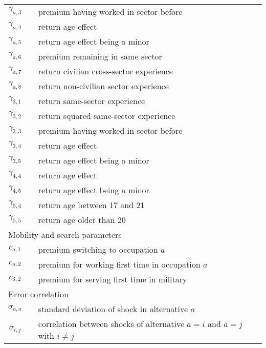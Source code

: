 \begin{ThreePartTable}
\begin{longtable}{@{}cll@{}}
$\gamma_{a,3}$       &  & premium having worked in sector before        							   \\
$\gamma_{a,4}$       &  & return age effect                             											     \\
$\gamma_{a,5}$       &  & return age effect being a minor               										\\
$\gamma_{a,6}$       &  & premium remaining in same sector              								   \\
$\gamma_{a,7}$       &  & return civilian cross-sector experience       								    \\
$\gamma_{a,8}$       &  & return non-civilian sector experience       										 \\
$\gamma_{3,1}$       &  & return same-sector experience                 									  \\
$\gamma_{3,2}$       &  & return squared same-sector experience    										 \\
$\gamma_{3,3}$       &  & premium having worked in sector before   										\\
$\gamma_{3,4}$       &  & return age effect                             												 \\
$\gamma_{3,5}$       &  & return age effect being a minor              	   										\\
$\gamma_{4,4}$       &  & return age effect                             												 \\
$\gamma_{4,5}$       &  & return age effect being a minor                  										\\
$\gamma_{5,4}$       &  & return age between 17 and 21                 	  									   \\
$\gamma_{5,5}$       &  & return age older than 20							   										\\[7.5pt] \midrule
\multicolumn{3}{l}{Mobility and search parameters}          													  \\ \midrule 
$c_{a,1}$            &  & premium switching to occupation $a$           									   \\
$c_{a,2}$            &  & premium for working first time in occupation $a$         										  \\
$c_{3,2}$            &  & premium for serving first time in military    										  \\[7.5pt] \midrule
\multicolumn{3}{l}{Error correlation}          													  									\\ \midrule 
$\sigma_{a,a}$	&	& standard deviation of shock in alternative $a$									\\
$\sigma_{i,j}$ &	& correlation between shocks of alternative $a = i$ and $a=j$ with $i \neq j$ \\

\end{longtable}
\end{ThreePartTable}
